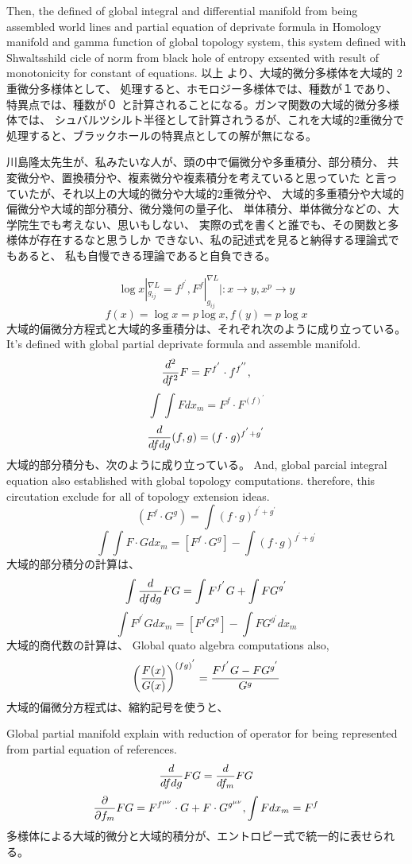 \documentclass{jsarticle}
\begin{document}
    Then, the defined of global integral and differential manifold
    from being assembled world lines and partial equation of deprivate
    formula in Homology manifold and gamma function of global topology
    system, this system defined with Shwaltsshild cicle of norm from
    black hole of entropy exsented with result of monotonicity for
    constant of equations.
    以上 より、大域的微分多様体を大域的 2重微分多様体として、
    処理すると、ホモロジー多様体では、種数が１であり、特異点では、種数が０
    と計算されることになる。ガンマ関数の大域的微分多様体では、
    シュバルツシルト半径として計算されうるが、これを大域的2重微分で
    処理すると、ブラックホールの特異点としての解が無になる。

    川島隆太先生が、私みたいな人が、頭の中で偏微分や多重積分、部分積分、
    共変微分や、置換積分や、複素微分や複素積分を考えていると思っていた
    と言っていたが、それ以上の大域的微分や大域的2重微分や、
    大域的多重積分や大域的偏微分や大域的部分積分、微分幾何の量子化、
    単体積分、単体微分などの、大学院生でも考えない、思いもしない、
    実際の式を書くと誰でも、その関数と多様体が存在するなと思うしか
    できない、私の記述式を見ると納得する理論式でもあると、
    私も自慢できる理論であると自負できる。

  $$ \log x|_{g_{ij}}^{\nabla L} = f^{f^{'}}, F^f|_{g_{ij}}^{\nabla L}
  |: x \to y, x^p \to y $$ 
  $$  f(x) = \log x = p \log x, f(y) = p \log x  $$
  大域的偏微分方程式と大域的多重積分は、それぞれ次のように成り立っている。
  It's defined with global partial deprivate formula and assemble manifold. 
  $$ {d^2 \over df^2}F = F^{f^{'}}\cdot f^{f^{''}},  $$
  $$ \int \int F dx_m = F^f \cdot F^{(f)^{'}} $$
  $$ {d \over df dg}(f,g) = (f \cdot g)^{f^{'} + g^{'}} $$
  大域的部分積分も、次のように成り立っている。
  And, global parcial integral equation also established with global
  topology computations. therefore, this circutation exclude for all of
  topology extension ideas.
  $$ (F^f \cdot G^g) = \int (f \cdot g)^{f^{'} + g^{'}} $$
  $$ \int \int F\cdot G dx_m = [F^f \cdot G^g] - 
  \int (f \cdot g)^{f^{'} + g^{'}} $$
  大域的部分積分の計算は、
  $$ \int {d \over {df dg}}FG = \int F^{f^{'}}G + \int F G^{g^{'}} $$
  $$ \int F^{f^{'}}Gdx_m = [F^f G^g] - \int F G^{g^{'}}dx_m$$
  大域的商代数の計算は、
  Global quato algebra computations also,
  $$ \left({F(x) \over G(x)}\right)^{(fg)^{'}} = {F^{f^{'}}G - FG^{g^{'}}
  \over G^{g}} $$
  大域的偏微分方程式は、縮約記号を使うと、

  Global partial manifold explain with reduction of operator for being
  represented from partial equation of references.
  $$ {d \over df dg}FG = {d \over df_m}FG $$
  $$ {\partial \over \partial f_m}FG = F^{f^{\mu\nu}}\cdot G
  + F \cdot G^{g^{\mu\nu}}, \int F dx_m = F^f $$
  多様体による大域的微分と大域的積分が、エントロピー式で統一的に表せられる。
\end{document}
